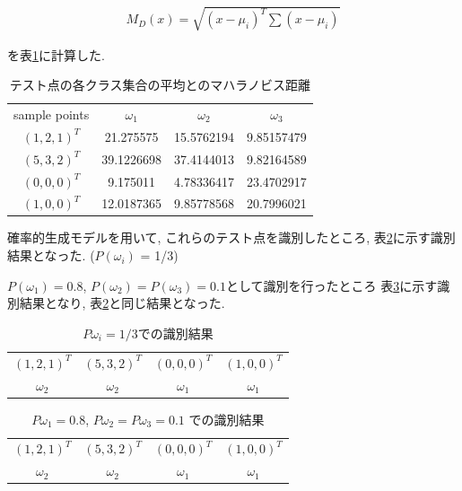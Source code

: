 \documentclass[10pt,a4paper,twocolumn]{jarticle}
\begin{document}
\begin{eqnarray}
  M_{D}(x) = \sqrt{(x - \mu_{i})^T \sum (x - \mu_i)}
\end{eqnarray}

を表\ref{tbl:mahalanobis}に計算した. 

\begin{table}[htbp]
  \begin{tabular}{cccc}
    sample points & $\omega_1$ & $\omega_2$ & $\omega_3$ \\
    $(1, 2, 1)^T$ & 21.275575 & 15.5762194 & 9.85157479 \\
    $(5, 3, 2)^T$ & 39.1226698 & 37.4144013 & 9.82164589 \\
    $(0, 0, 0)^T$ & 9.175011 & 4.78336417 & 23.4702917 \\
    $(1, 0, 0)^T$ & 12.0187365 & 9.85778568 & 20.7996021
  \end{tabular}
  \caption{テスト点の各クラス集合の平均とのマハラノビス距離}
  \label{tbl:mahalanobis}
\end{table}

確率的生成モデルを用いて, これらのテスト点を識別したところ, 
表\ref{tbl:prob-discrimination-1}に示す識別結果となった. ($P(\omega_i)$ = 1/3)

$P(\omega_1)=0.8$, $P(\omega_2)=P(\omega_3)=0.1$として識別を行ったところ
表\ref{tbl:prob-discrimination-2}に示す識別結果となり, 
表\ref{tbl:prob-discrimination-1}と同じ結果となった. 

\begin{table}[htbp]
  \begin{tabular}{cccc}
    $(1, 2, 1)^T$ & $(5, 3, 2)^T$ & $(0, 0, 0)^T$ & $(1, 0, 0)^T$ \\
    $\omega_2$ & $\omega_2$ & $\omega_1$ & $\omega_1$
  \end{tabular}
  \caption{$P{\omega_i}=1/3$での識別結果}
  \label{tbl:prob-discrimination-1}
\end{table}

\begin{table}[htbp]
  \begin{tabular}{cccc}
    $(1, 2, 1)^T$ & $(5, 3, 2)^T$ & $(0, 0, 0)^T$ & $(1, 0, 0)^T$ \\
    $\omega_2$ & $\omega_2$ & $\omega_1$ & $\omega_1$
  \end{tabular}
  \caption{$P{\omega_1}=0.8$, $P{\omega_2}=P{\omega_3}=0.1$ での識別結果}
  \label{tbl:prob-discrimination-2}
\end{table}

\end{document}
